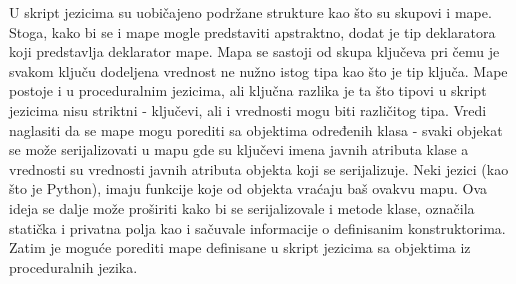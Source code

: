 U skript jezicima su uobičajeno podržane strukture kao što su skupovi i mape. Stoga, kako bi se i mape mogle predstaviti apstraktno, dodat je tip deklaratora koji predstavlja deklarator mape. Mapa se sastoji od skupa ključeva pri čemu je svakom ključu dodeljena vrednost ne nužno istog tipa kao što je tip ključa. Mape postoje i u proceduralnim jezicima, ali ključna razlika je ta što tipovi u skript jezicima nisu striktni - ključevi, ali i vrednosti mogu biti različitog tipa. Vredi naglasiti da se mape mogu porediti sa objektima određenih klasa - svaki objekat se može serijalizovati u mapu gde su ključevi imena javnih atributa klase a vrednosti su vrednosti javnih atributa objekta koji se serijalizuje. Neki jezici (kao što je Python), imaju funkcije koje od objekta vraćaju baš ovakvu mapu. Ova ideja se dalje može proširiti kako bi se serijalizovale i metode klase, označila statička i privatna polja kao i sačuvale informacije o definisanim konstruktorima. Zatim je moguće porediti mape definisane u skript jezicima sa objektima iz proceduralnih jezika.
